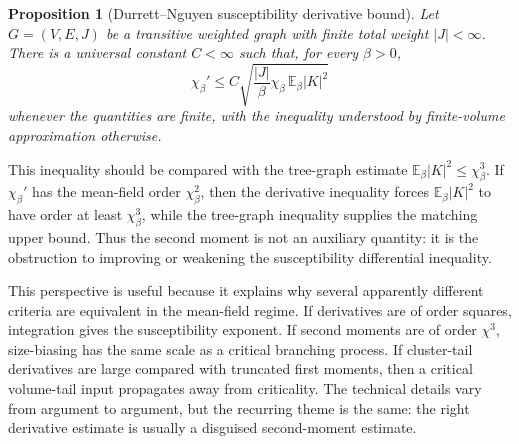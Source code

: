 \documentclass[11pt,reqno]{book}
\numberwithin{equation}{chapter}
\theoremstyle{plain}
\newtheorem{prop}[theorem]{Proposition}
\theoremstyle{definition}
\theoremstyle{remark}
\newcommand{\E}{\mathbb E}
\newcommand{\1}{\mathbf 1}
\begin{document}
\begin{prop}[Durrett--Nguyen susceptibility derivative bound]
\label{prop:durrett-nguyen}
Let \(G=(V,E,J)\) be a transitive weighted graph with finite total weight
\(|J|<\infty\). There is a universal constant \(C<\infty\) such that, for
every \(\beta>0\),
\[
  \chi_\beta'
  \leq
  C\sqrt{\frac{|J|}{\beta}\chi_\beta\,\E_\beta |K|^2}
\]
whenever the quantities are finite, with the inequality understood by
finite-volume approximation otherwise.
\end{prop}

This inequality should be compared with the tree-graph estimate
\(\E_\beta|K|^2\leq\chi_\beta^3\). If \(\chi_\beta'\) has the mean-field order
\(\chi_\beta^2\), then the derivative inequality forces
\(\E_\beta|K|^2\) to have order at least \(\chi_\beta^3\), while the
tree-graph inequality supplies the matching upper bound. Thus the second
moment is not an auxiliary quantity: it is the obstruction to improving or
weakening the susceptibility differential inequality.

This perspective is useful because it explains why several apparently different criteria are equivalent in the mean-field regime. If derivatives are of order squares, integration gives the susceptibility exponent. If second moments are of order \(\chi^3\), size-biasing has the same scale as a critical branching process. If cluster-tail derivatives are large compared with truncated first moments, then a critical volume-tail input propagates away from criticality. The technical details vary from argument to argument, but the recurring theme is the same: the right derivative estimate is usually a disguised second-moment estimate.
\end{document}
